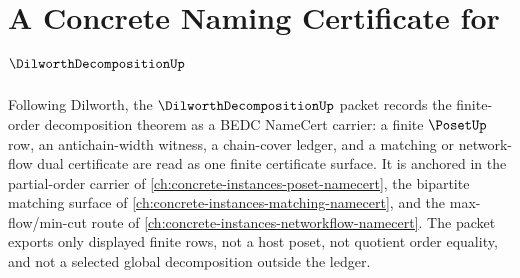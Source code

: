 \chapter{A Concrete Naming Certificate for $\DilworthDecompositionUp$}
\label{ch:concrete-instances-dilworth-decomposition-namecert}

Following Dilworth, the $\DilworthDecompositionUp$ packet records the finite-order decomposition theorem as a BEDC NameCert carrier: a finite $\PosetUp$ row, an antichain-width witness, a chain-cover ledger, and a matching or network-flow dual certificate are read as one finite certificate surface. It is anchored in the partial-order carrier of \autoref{ch:concrete-instances-poset-namecert}, the bipartite matching surface of \autoref{ch:concrete-instances-matching-namecert}, and the max-flow/min-cut route of \autoref{ch:concrete-instances-networkflow-namecert}. The packet exports only displayed finite rows, not a host poset, not quotient order equality, and not a selected global decomposition outside the ledger.

